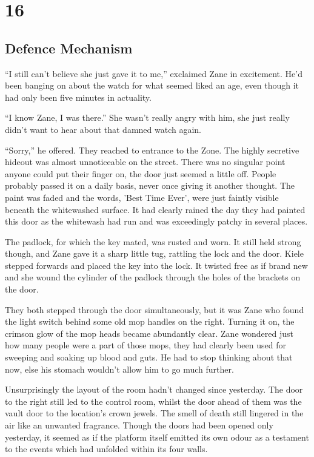 \chapter{16}
\section{Defence Mechanism}


``I still can't believe she just gave it to me,'' exclaimed Zane in excitement.  He'd been banging on about the watch for what seemed liked an age, even though it had only been five minutes in actuality.  

``I know Zane, I was there.'' She wasn't really angry with him, she just really didn't want to hear about that damned watch again.  

``Sorry,'' he offered.  They reached to entrance to the Zone.  The highly secretive hideout was almost unnoticeable on the street.  There was no singular point anyone could put their finger on, the door just seemed a little off.  People probably passed it on a daily basis, never once giving it another thought.  The paint was faded and the words, 'Best Time Ever', were just faintly visible beneath the whitewashed surface.  It had clearly rained the day they had painted this door as the whitewash had run and was exceedingly patchy in several places.

The padlock, for which the key mated, was rusted and worn.  It still held strong though, and Zane gave it a sharp little tug, rattling the lock and the door.  Kiele stepped forwards and placed the key into the lock.  It twisted free as if brand new and she wound the cylinder of the padlock through the holes of the brackets on the door.

They both stepped through the door simultaneously, but it was Zane who found the light switch behind some old mop handles on the right.  Turning it on, the crimson glow of the mop heads became abundantly clear.  Zane wondered just how many people were a part of those mops, they had clearly been used for sweeping and soaking up blood and guts.  He had to stop thinking about that now, else his stomach wouldn't allow him to go much further.

Unsurprisingly the layout of the room hadn't changed since yesterday.  The door to the right still led to the control room, whilst the door ahead of them was the vault door to the location's crown jewels.  The smell of death still lingered in the air like an unwanted fragrance.  Though the doors had been opened only yesterday, it seemed as if the platform itself emitted its own odour as a testament to the events which had unfolded within its four walls.

